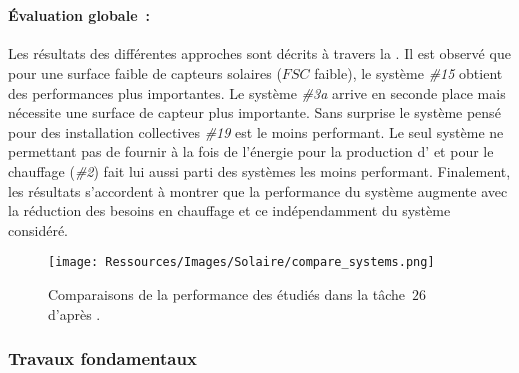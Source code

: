 \begin{table}
\begin{tabular}{l *{6}{C{2.2cm}} *{5}{G} G}
    \midrule
    \bottomrule
\end{tabular}
\\[10pt]
\begin{tabular}{l *{6}{G} *{5}{c} r}
    \toprule
    \midrule
    \bottomrule
\end{tabular}
\end{table}

\paragraph{Évaluation globale~:} %
\label{par:evaluation_globale}
Les résultats des différentes approches sont décrits à travers la .
Il est observé que pour une surface faible de capteurs solaires ($FSC$ faible), le système \emph{\#15}
obtient des performances plus importantes. Le système \emph{\#3a} arrive en seconde place
mais nécessite une surface de capteur plus importante. Sans surprise le système pensé
pour des installation collectives \emph{\#19} est le moins performant. Le seul système
ne permettant pas de fournir à la fois de l’énergie pour la production d’
et pour le chauffage (\emph{\#2}) fait lui aussi parti des systèmes les moins performant.
Finalement, les résultats s’accordent à montrer que la performance du système augmente avec la réduction des
besoins en chauffage et ce indépendamment du système considéré.

\begin{figure}
    \centering
    \texttt{[image: Ressources/Images/Solaire/compare\_systems.png]}
    \caption{Comparaisons de la performance des  étudiés dans la tâche
             \,$26$ d’après \textcite{Task26C2007}.}
    \label{fig:compare_perf_ssc}
\end{figure}


\subsubsection{Travaux fondamentaux} %
\label{ssub:travaux_fondamentaux}
